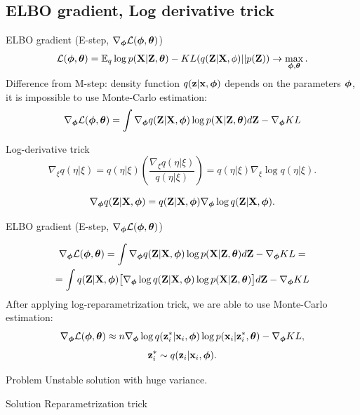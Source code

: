 \subsection{ELBO gradient, Log derivative trick}
\begin{frame}{ELBO gradient (E-step, $\nabla_{\boldsymbol{\phi}} \mathcal{L}(\boldsymbol{\phi}, \boldsymbol{\theta})$)}
\vspace{-0.3cm}
\[
	\mathcal{L} (\boldsymbol{\phi}, \boldsymbol{\theta})  = \mathbb{E}_{q} \log p(\mathbf{X} | \mathbf{Z}, \boldsymbol{\theta}) - KL (q(\mathbf{Z}| \mathbf{X}, \phi) || p(\mathbf{Z})) \rightarrow \max_{\boldsymbol{\phi}, \boldsymbol{\theta}}.
\]
	Difference from M-step: density function $q(\mathbf{z}| \mathbf{x}, \boldsymbol{\phi})$ depends on the parameters $\boldsymbol{\phi}$, it is impossible to use Monte-Carlo estimation:
	\[
		\nabla_{\boldsymbol{\phi}} \mathcal{L} (\boldsymbol{\phi}, \boldsymbol{\theta}) = \int \nabla_{\boldsymbol{\phi}} q(\mathbf{Z}| \mathbf{X}, \boldsymbol{\phi}) \log p(\mathbf{X} |\mathbf{Z}, \boldsymbol{\theta}) d\mathbf{Z} - \nabla_{\boldsymbol{\phi}} KL
	\]
	
	\begin{block}{Log-derivative trick}
	    \[
	    \nabla_\xi q(\eta| \xi) = q(\eta | \xi) \left( \frac{\nabla_\xi q(\eta | \xi)}{q(\eta| \xi)} \right) = q(\eta | \xi) \nabla_\xi \log q(\eta| \xi).
	    \]
	\end{block}
	\[
		\nabla_{\boldsymbol{\phi}} q(\mathbf{Z}| \mathbf{X}, \boldsymbol{\phi}) = q(\mathbf{Z}| \mathbf{X}, \boldsymbol{\phi}) \nabla_{\boldsymbol{\phi}} \log q(\mathbf{Z}| \mathbf{X}, \boldsymbol{\phi}).
	\]
\end{frame}
\begin{frame}{ELBO gradient (E-step, $\nabla_{\boldsymbol{\phi}} \mathcal{L}(\boldsymbol{\phi}, \boldsymbol{\theta})$)}

	\begin{multline*}
		\nabla_{\boldsymbol{\phi}} \mathcal{L} (\boldsymbol{\phi}, \boldsymbol{\theta}) = \int \nabla_{\boldsymbol{\phi}} q(\mathbf{Z}| \mathbf{X}, \boldsymbol{\phi}) \log p(\mathbf{X} |\mathbf{Z}, \boldsymbol{\theta}) d\mathbf{Z}  - \nabla_{\boldsymbol{\phi}} KL = \\ 
		=  \int q(\mathbf{Z}| \mathbf{X}, \boldsymbol{\phi}) \bigl[  \nabla_{\boldsymbol{\phi}} \log q(\mathbf{Z}| \mathbf{X}, \boldsymbol{\phi}) \log p(\mathbf{X} |\mathbf{Z}, \boldsymbol{\theta}) \bigr] d\mathbf{Z} - \nabla_{\boldsymbol{\phi}} KL
	\end{multline*}
	After applying log-reparametrization trick, we are able to use Monte-Carlo estimation:
	\[
		\nabla_{\boldsymbol{\phi}} \mathcal{L} (\boldsymbol{\phi}, \boldsymbol{\theta}) \approx n \nabla_{\boldsymbol{\phi}} \log q(\mathbf{z}_i^*| \mathbf{x}_i, \boldsymbol{\phi}) \log p(\mathbf{x}_i |\mathbf{z}_i^*, \boldsymbol{\theta}) - \nabla_{\boldsymbol{\phi}} KL,
	\]
	\[
		\mathbf{z}_i^* \sim q(\mathbf{z}_i| \mathbf{x}_i, \boldsymbol{\phi}).
	\]
	\vspace{-0.2cm}
	\begin{block}{Problem} 
	Unstable solution with huge variance.
	\end{block}
	\begin{block}{Solution}
	    Reparametrization trick
	\end{block}
\end{frame}
